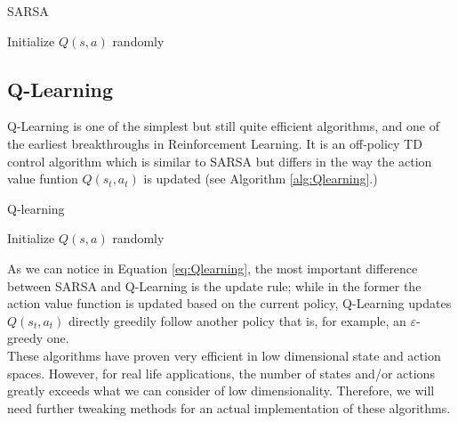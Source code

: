 \begin{algorithm}
	\caption{SARSA}
	\SetAlgoLined
	\DontPrintSemicolon
	Initialize $Q(s,a)$ randomly\;
\end{algorithm}



\subsection{Q-Learning}
\label{sec:qlearning}

Q-Learning\cite{watkins1992q} is one of the simplest but still quite efficient algorithms, and one of the earliest breakthroughs in Reinforcement Learning. It is an off-policy TD control algorithm which is similar to SARSA but differs in the way the action value funtion $Q(s_t, a_t)$ is updated (see Algorithm \ref{alg:Qlearning}.)

\begin{algorithm}[H]
	\label{alg:Qlearning}
	\caption{Q-learning}
	\SetAlgoLined
	\DontPrintSemicolon
	Initialize $Q(s,a)$ randomly\;
\end{algorithm}

As we can notice in Equation \ref{eq:Qlearning}, the most important difference between SARSA and Q-Learning is the update rule; while in the former the action value function is updated based on the current policy, Q-Learning updates $Q(s_t, a_t)$ directly greedily follow another policy that is, for example, an $\varepsilon$-greedy one.
\\
\indent These algorithms have proven very efficient in low dimensional state and action spaces. However, for real life applications, the number of states and/or actions greatly exceeds what we can consider of low dimensionality. Therefore, we will need further tweaking methods for an actual implementation of these algorithms.

